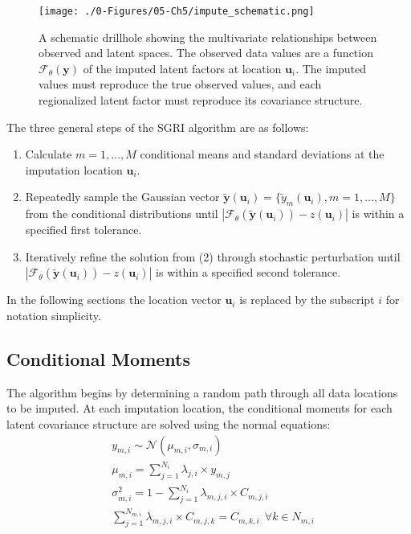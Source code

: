\begin{figure}[htb!]
    \centering
    \texttt{[image: ./0-Figures/05-Ch5/impute\_schematic.png]}
    \caption{A schematic drillhole showing the multivariate relationships between observed and latent spaces. The observed data values are a function $\mathcal{F}_{\theta}\left(\mathbf{y}\right)$ of the imputed latent factors at location $\mathbf{u}_{i}$. The imputed values must reproduce the true observed values, and each regionalized latent factor must reproduce its covariance structure. }
    \label{fig:impute_schematic}
\end{figure}

The three general steps of the \gls{SGRI} algorithm are as follows:
\begin{enumerate}
    \item Calculate $m=1,\dots,M$ conditional means and standard deviations at the imputation location $\mathbf{u}_{i}$.
    \item Repeatedly sample the Gaussian vector $\tilde{\mathbf{y}}(\mathbf{u}_{i}) = \{\tilde{y}_{m}(\mathbf{u}_{i}), m=1,\dots,M \}$ from the conditional distributions until $\left|\mathcal{F}_{\theta}(\tilde{\mathbf{y}}(\mathbf{u}_{i})) - z(\mathbf{u}_{i})\right|$ is within a specified first tolerance.
    \item Iteratively refine the solution from (2) through stochastic perturbation until $\left|\mathcal{F}_{\theta}(\tilde{\mathbf{y}}(\mathbf{u}_{i})) - z(\mathbf{u}_{i})\right|$ is within a specified second tolerance.
\end{enumerate}

In the following sections the location vector $\mathbf{u}_{i}$ is replaced by the subscript $i$ for notation simplicity.

\subsection{Conditional Moments}
\label{subsec:condmom}

The algorithm begins by determining a random path through all data locations to be imputed. At each imputation location, the conditional moments for each latent covariance structure are solved using the normal equations:
\begin{align}
     & y_{m,i} \sim {\mathcal {N}}\left( \mu_{m,i}, \sigma_{m,i} \right)                           \\
     & \mu_{m,i} = \sum_{j=1}^{N_{i}} \lambda_{j,i} \times y_{m,j}                                 \\
     & \sigma_{m,i}^{2} = 1 - \sum_{j=1}^{N_{i}} \lambda_{m,j,i} \times C_{m,j,i}                  \\
     & \sum_{j=1}^{N_{m,i}} \lambda_{m,j,i} \times C_{m,j,k} = C_{m,k,i} \ \ \forall k \in N_{m,i}
\end{align}

